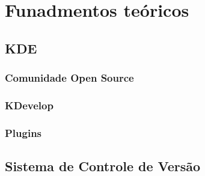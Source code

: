 \chapter{Funadmentos teóricos}
\lipsum[1-4]

\section{KDE}
\lipsum[1-4]

\subsection{Comunidade Open Source}
\lipsum[1-4]

\subsection{KDevelop}
\lipsum[1-4]

\subsection{Plugins}
\lipsum[1-4]

\section{Sistema de Controle de Versão}
\lipsum[1-4]
